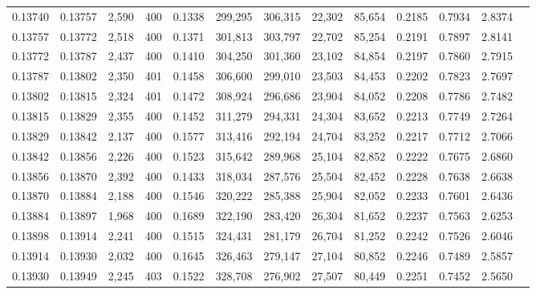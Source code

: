 \begin{tabular}{rrrrrrrrrrrrr}
0.13740 & 0.13757 &  2,590 &   400 &                                     0.1338 & 299,295 & 306,315 &  22,302 &  85,654 & 0.2185 & 0.7934 & 2.8374 \\
0.13757 & 0.13772 &  2,518 &   400 &                                     0.1371 & 301,813 & 303,797 &  22,702 &  85,254 & 0.2191 & 0.7897 & 2.8141 \\
0.13772 & 0.13787 &  2,437 &   400 &                                     0.1410 & 304,250 & 301,360 &  23,102 &  84,854 & 0.2197 & 0.7860 & 2.7915 \\
0.13787 & 0.13802 &  2,350 &   401 &                                     0.1458 & 306,600 & 299,010 &  23,503 &  84,453 & 0.2202 & 0.7823 & 2.7697 \\
0.13802 & 0.13815 &  2,324 &   401 &                                     0.1472 & 308,924 & 296,686 &  23,904 &  84,052 & 0.2208 & 0.7786 & 2.7482 \\
0.13815 & 0.13829 &  2,355 &   400 &                                     0.1452 & 311,279 & 294,331 &  24,304 &  83,652 & 0.2213 & 0.7749 & 2.7264 \\
0.13829 & 0.13842 &  2,137 &   400 &                                     0.1577 & 313,416 & 292,194 &  24,704 &  83,252 & 0.2217 & 0.7712 & 2.7066 \\
0.13842 & 0.13856 &  2,226 &   400 &                                     0.1523 & 315,642 & 289,968 &  25,104 &  82,852 & 0.2222 & 0.7675 & 2.6860 \\
0.13856 & 0.13870 &  2,392 &   400 &                                     0.1433 & 318,034 & 287,576 &  25,504 &  82,452 & 0.2228 & 0.7638 & 2.6638 \\
0.13870 & 0.13884 &  2,188 &   400 &                                     0.1546 & 320,222 & 285,388 &  25,904 &  82,052 & 0.2233 & 0.7601 & 2.6436 \\
0.13884 & 0.13897 &  1,968 &   400 &                                     0.1689 & 322,190 & 283,420 &  26,304 &  81,652 & 0.2237 & 0.7563 & 2.6253 \\
0.13898 & 0.13914 &  2,241 &   400 &                                     0.1515 & 324,431 & 281,179 &  26,704 &  81,252 & 0.2242 & 0.7526 & 2.6046 \\
0.13914 & 0.13930 &  2,032 &   400 &                                     0.1645 & 326,463 & 279,147 &  27,104 &  80,852 & 0.2246 & 0.7489 & 2.5857 \\
0.13930 & 0.13949 &  2,245 &   403 &                                     0.1522 & 328,708 & 276,902 &  27,507 &  80,449 & 0.2251 & 0.7452 & 2.5650 \\

\end{tabular}
